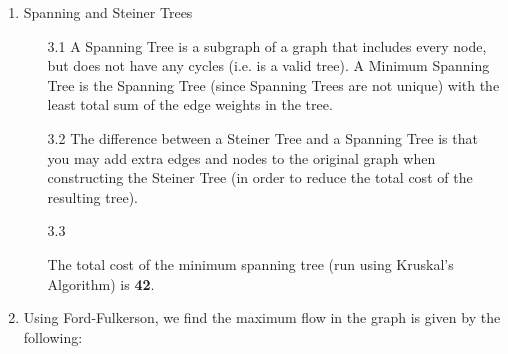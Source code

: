 \begin{enumerate}
  \item Spanning and Steiner Trees
    \begin{enumerate}
      \item [3.1] A Spanning Tree is a subgraph of a graph that includes every node, but does not have any cycles (i.e. is a valid tree). A Minimum Spanning Tree is the Spanning Tree (since Spanning Trees are not unique) with the least total sum of the edge weights in the tree.
      \item [3.2] The difference between a Steiner Tree and a Spanning Tree is that you may add extra edges and nodes to the original graph when constructing the Steiner Tree (in order to reduce the total cost of the resulting tree).
      \item [3.3] 

        The total cost of the minimum spanning tree (run using Kruskal's Algorithm) is \textbf{42}.
        \begin{figure}[H]
        \end{figure}
    \end{enumerate}


  \item Using Ford-Fulkerson, we find the maximum flow in the graph is given by the following:
    \begin{figure}[H]
\end{figure}
\end{enumerate}
